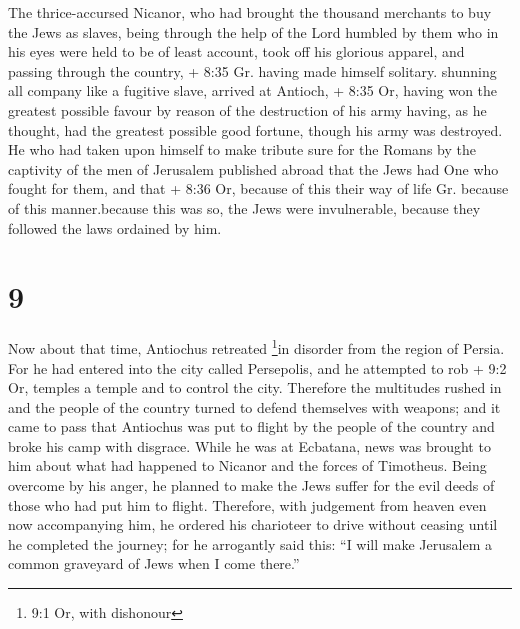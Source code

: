 The thrice-accursed Nicanor, who had brought the thousand
merchants to buy the Jews as slaves,  being through the
help of the Lord humbled by them who in his eyes were held to be of
least account, took off his glorious apparel, and passing through the
country, + 8:35 Gr. having made himself solitary. shunning all company
like a fugitive slave, arrived at Antioch, + 8:35 Or, having won the
greatest possible favour by reason of the destruction of his army
having, as he thought, had the greatest possible good fortune, though
his army was destroyed.  He who had taken upon himself to
make tribute sure for the Romans by the captivity of the men of
Jerusalem published abroad that the Jews had One who fought for them,
and that + 8:36 Or, because of this their way of life Gr. because of
this manner.because this was so, the Jews were invulnerable, because
they followed the laws ordained by him.

\hypertarget{section-7}{%
\section{9}\label{section-7}}

 Now about that time, Antiochus retreated \footnote{9:1 Or,
  with dishonour}in disorder from the region of Persia.  For
he had entered into the city called Persepolis, and he attempted to rob
+ 9:2 Or, temples a temple and to control the city. Therefore the
multitudes rushed in and the people of the country turned to defend
themselves with weapons; and it came to pass that Antiochus was put to
flight by the people of the country and broke his camp with disgrace.
 While he was at Ecbatana, news was brought to him about
what had happened to Nicanor and the forces of Timotheus. 
Being overcome by his anger, he planned to make the Jews suffer for the
evil deeds of those who had put him to flight. Therefore, with judgement
from heaven even now accompanying him, he ordered his charioteer to
drive without ceasing until he completed the journey; for he arrogantly
said this: ``I will make Jerusalem a common graveyard of Jews when I
come there.''


